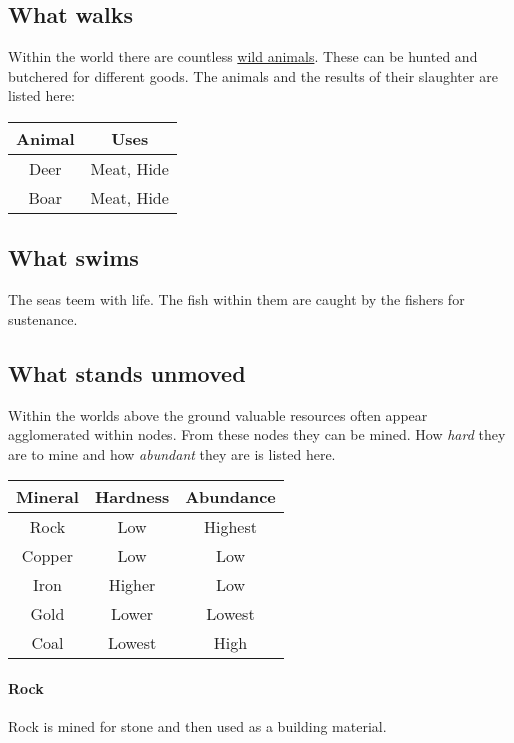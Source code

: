 \subsection{What walks}\label{ch:Goods:Nature:Animals}
Within the world there are countless
\hyperref[ch:World:Inhabitants:Animals]{wild animals}. These can be hunted and
butchered for different goods. The animals and the results of their slaughter
are listed here:

\begin{longtable}{cc}
	\toprule
	Animal & Uses                   \\
	\midrule
	Deer   & \Gls{Meat}, \gls{Hide} \\
	Boar   & \Gls{Meat}, \gls{Hide} \\
	\bottomrule
\end{longtable}

\subsection{What swims}\label{ch:Goods:Nature:Sea}
The seas teem with life. The fish within them are caught by the fishers for
sustenance.

\subsection{What stands unmoved}\label{ch:Goods:Nature:Minerals}
Within the worlds above the ground valuable resources often appear agglomerated
within nodes. From these nodes they can be mined. How \emph{hard} they are to
mine and how \emph{abundant} they are is listed here.

\begin{longtable}{ccc}
	\toprule
	Mineral & Hardness & Abundance \\
	\midrule
	Rock    & Low      & Highest   \\
	Copper  & Low      & Low       \\
	Iron    & Higher   & Low       \\
	Gold    & Lower    & Lowest    \\
	Coal    & Lowest   & High      \\
	\bottomrule
\end{longtable}

\paragraph{Rock}
Rock is mined for stone and then used as a building material.

